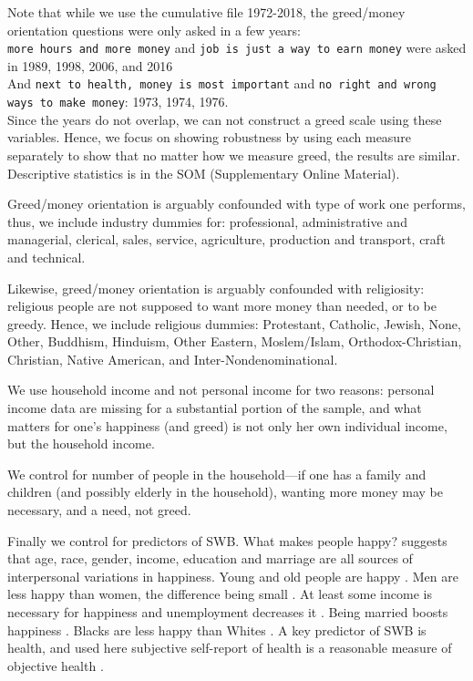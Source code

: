 \documentclass[10pt, letterpaper]{article}
\begin{document}
\begin{spacing}{1.8}
Note that while we use the cumulative file  1972-2018, the greed/money orientation questions were only asked in a few years:\\
\texttt{more hours and more money} and \texttt{job is just a way to earn money} were asked in 1989, 1998, 2006, and 2016\\
And \texttt{next to  health, money is most  important} and \texttt{no right and wrong  ways to  make money}: 1973, 1974, 1976.\\

Since the years do not overlap, we can not construct a greed scale using these variables. Hence, we focus on
showing robustness by using each measure separately to show that no matter how we measure greed, the results are similar. 
%
 Descriptive statistics is in the SOM (Supplementary Online Material).

Greed/money orientation is arguably confounded with type of work one performs, thus, we include industry dummies for: professional, administrative and managerial, clerical, sales, service, agriculture, production and transport, craft and technical.           

Likewise, greed/money orientation is arguably confounded with religiosity:
religious people are not supposed to want more money than needed, or to be
greedy. Hence, we include religious dummies: Protestant, Catholic, Jewish, None,
Other, Buddhism, Hinduism, Other Eastern, Moslem/Islam, Orthodox-Christian,
Christian, Native American, and Inter-Nondenominational.

We use household income and not personal income for two reasons: personal income data are missing for a substantial portion of the sample, and  what matters for one's happiness (and greed) is not only her own individual income, but the household income.

We control for number of people in the household---if one has a family and
children (and possibly elderly in the household), wanting more money may be
necessary, and a need, not greed.

Finally we control for predictors of SWB. What makes people happy?
\citet{myers00} suggests that age, race, gender, income, education and marriage are all sources of interpersonal variations in happiness. Young and old people
are happy  \citep[e.g.,][]{teksoz}. Men are less happy than women, the difference being small \citep{blanchflower04o}. At least some income is necessary for happiness and unemployment decreases it
    \citep[e.g.,][]{ditella01moa,ditella01mob,ditella06m}. Being married boosts happiness \citep[e.g.,][]{myers00,diener04s}.
     Blacks are less happy than Whites
    \citep[e.g.,][]{aokcities,aok11a,blanchflower04o}.   
     A key predictor of SWB is health, and used here subjective self-report of health is a reasonable measure of objective health \citep{subramanian09b}.


\end{spacing}
\end{document}

